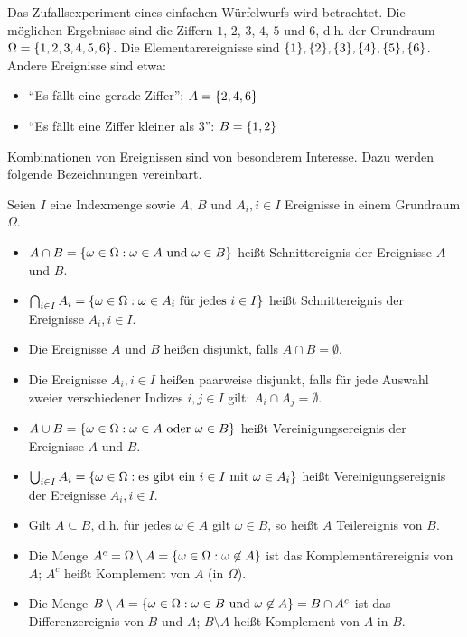 \documentclass{lecture}
\begin{document}
    \begin{example}
        Das Zufallsexperiment eines einfachen Würfelwurfs wird betrachtet.
        Die möglichen Ergebnisse sind die Ziffern \(1\), \(2\), \(3\), \(4\), \(5\) und \(6\), d.h. der Grundraum \(\Omega = \braces*{1, 2, 3, 4, 5, 6}\).
        Die Elementarereignisse sind \(\braces*{1}, \braces*{2}, \braces*{3}, \braces*{4}, \braces*{5}, \braces*{6}\).
        Andere Ereignisse sind etwa:
        \begin{itemize}
            \item ``Es fällt eine gerade Ziffer'': \(A = \braces*{2, 4, 6}\)
            \item ``Es fällt eine Ziffer kleiner als \(3\)'': \(B = \braces*{1, 2}\)
        \end{itemize}
        Kombinationen von Ereignissen sind von besonderem Interesse.
        Dazu werden folgende Bezeichnungen vereinbart.
    \end{example}

    \begin{remark}
        Seien \(I\) eine Indexmenge sowie \(A\), \(B\) und \(A_i, i \in I\) Ereignisse in einem Grundraum \(\Omega\).
        \begin{itemize}
            \item \(A \cap B = \braces*{\omega \in \Omega : \omega \in A\text{ und }\omega \in B}\) heißt Schnittereignis der Ereignisse \(A\) und \(B\).
            \item \(\bigcap_{i \in I}A_i = \braces*{\omega \in \Omega : \omega \in A_i\text{ für jedes }i \in I}\) heißt Schnittereignis der Ereignisse \(A_i, i \in I\).
            \item Die Ereignisse \(A\) und \(B\) heißen disjunkt, falls \(A \cap B = \emptyset\).
            \item Die Ereignisse \(A_i, i \in I\) heißen paarweise disjunkt, falls für jede Auswahl zweier verschiedener Indizes \(i, j \in I\) gilt: \(A_i \cap A_j = \emptyset\).
            \item \(A \cup B = \braces*{\omega \in \Omega : \omega \in A\text{ oder }\omega \in B}\) heißt Vereinigungsereignis der Ereignisse \(A\) und \(B\).
            \item \(\bigcup_{i \in I}A_i = \braces*{\omega \in \Omega : \text{es gibt ein }i \in I\text{ mit }\omega \in A_i}\) heißt Vereinigungsereignis der Ereignisse \(A_i, i \in I\).
            \item Gilt \(A \subseteq B\), d.h. für jedes \(\omega \in A\) gilt \(\omega \in B\), so heißt \(A\) Teilereignis von \(B\).
            \item Die Menge \(A^c = \Omega \setminus A = \braces*{\omega \in \Omega : \omega \not\in A}\) ist das Komplementärereignis von \(A\); \(A^c\) heißt Komplement von \(A\) (in \(\Omega\)).
            \item Die Menge \(B \setminus A = \braces*{\omega \in \Omega : \omega \in B\text{ und }\omega \not\in A} = B \cap A^c\) ist das Differenzereignis von \(B\) und \(A\); \(B \setminus A\) heißt Komplement von \(A\) in \(B\).
        \end{itemize}
    \end{remark}
\end{document}
